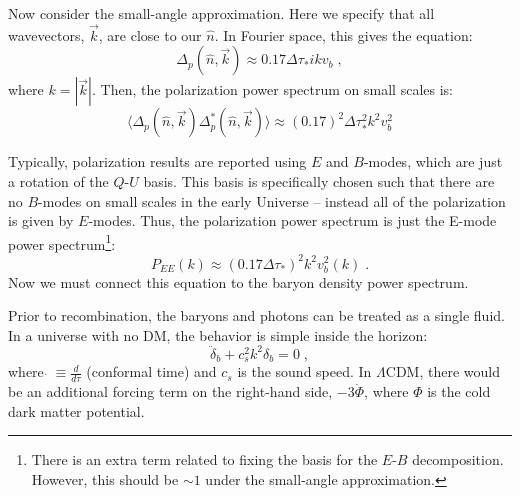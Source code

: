 \documentclass[12pt,floats,floatfix,showpacs,amssymb,amsmath,prl,superscriptaddress,nofootinbib, aps]{revtex4-2}
\begin{document}
Now consider the small-angle approximation. Here we specify that all wavevectors, $\vec{k}$, are close to our $\hat{n}$. In Fourier space, this gives the equation:
\begin{equation}
    \Delta_p(\hat{n}, \vec{k}) \approx 0.17 \Delta \tau_* ik v_b \; ,
\end{equation}
where $k = |\vec{k}|$. Then, the polarization power spectrum on small scales is:
\begin{equation}
    \langle \Delta_p(\hat{n}, \vec{k}) \Delta^*_p(\hat{n}, \vec{k}) \rangle \approx (0.17)^2 \Delta\tau_*^2 k^2 v_b^2
\end{equation}

Typically, polarization results are reported using $E$ and $B$-modes, which are just a rotation of the $Q$-$U$ basis. This basis is specifically chosen such that there are no $B$-modes on small scales in the early Universe -- instead all of the polarization is given by $E$-modes. Thus, the polarization power spectrum is just the E-mode power spectrum\footnote{There is an extra term related to fixing the basis for the $E$-$B$ decomposition. However, this should be $\sim 1$ under the small-angle approximation.}:
\begin{equation}\label{eqn:EEspec}
    P_{EE}(k) \approx (0.17 \Delta \tau_*)^2 k^2v^2_b(k) \; .
\end{equation}
Now we must connect this equation to the baryon density power spectrum. 

Prior to recombination, the baryons and photons can be treated as a single fluid. In a universe with no DM, the behavior is simple inside the horizon:
\begin{equation}
 \ddot{\delta}_b + c_s^2 k^2 \delta_b = 0  \; ,
\end{equation}
where $\dot{}~ \equiv \frac{d}{d\tau}$ (conformal time) and $c_s$ is the sound speed. In $\Lambda$CDM, there would be an additional forcing term on the right-hand side, $-3\dot{\Phi}$, where $\Phi$ is the cold dark matter potential.
\end{document}
